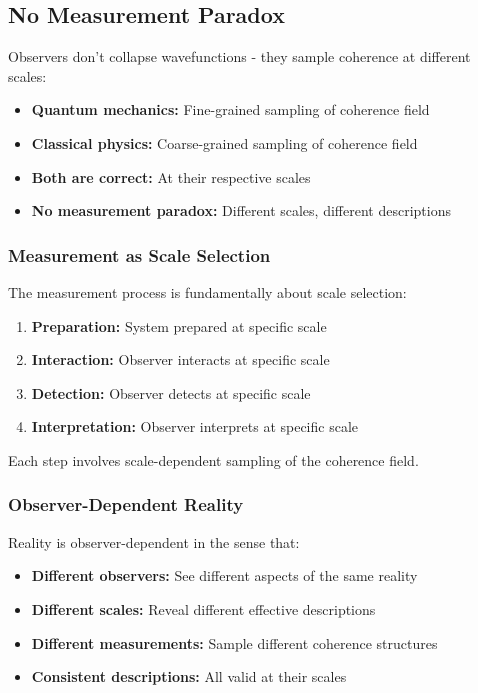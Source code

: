 \documentclass[11pt]{article}
\theoremstyle{definition}
\begin{document}
\subsection{No Measurement Paradox}

Observers don't collapse wavefunctions - they sample coherence at different scales:

\begin{itemize}
\item \textbf{Quantum mechanics:} Fine-grained sampling of coherence field
\item \textbf{Classical physics:} Coarse-grained sampling of coherence field
\item \textbf{Both are correct:} At their respective scales
\item \textbf{No measurement paradox:} Different scales, different descriptions
\end{itemize}

\subsubsection{Measurement as Scale Selection}

The measurement process is fundamentally about scale selection:

\begin{enumerate}
\item \textbf{Preparation:} System prepared at specific scale
\item \textbf{Interaction:} Observer interacts at specific scale
\item \textbf{Detection:} Observer detects at specific scale
\item \textbf{Interpretation:} Observer interprets at specific scale
\end{enumerate}

Each step involves scale-dependent sampling of the coherence field.

\subsubsection{Observer-Dependent Reality}

Reality is observer-dependent in the sense that:

\begin{itemize}
\item \textbf{Different observers:} See different aspects of the same reality
\item \textbf{Different scales:} Reveal different effective descriptions
\item \textbf{Different measurements:} Sample different coherence structures
\item \textbf{Consistent descriptions:} All valid at their scales
\end{itemize}
\end{document}
